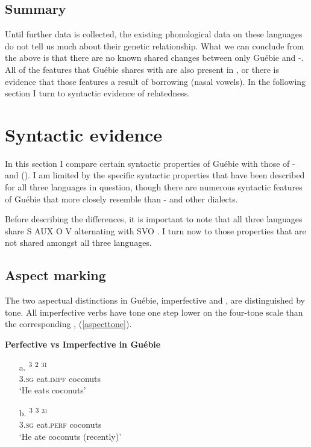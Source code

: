 \documentclass[output=paper,modfonts]{langscibook}
\begin{document}
\subsection{Summary}
Until further data is collected, the existing phonological data on these languages do not tell us much about their genetic relationship. What we can conclude from the above is that there are no known shared changes between only Guébie and -. All of the features that Guébie shares with  are also present in , or there is evidence that those features a result of borrowing (nasal vowels). In the following section I turn to syntactic evidence of relatedness.

\section{Syntactic evidence}\label{sec:sande:S-side}
In this section I compare certain syntactic properties of Guébie with those of - and  (). I am limited by the specific syntactic properties that have been described for all three languages in question, though there are numerous syntactic features of Guébie that more closely resemble  than - and other  dialects. 

Before describing the differences, it is important to note that all three languages share S AUX O V alternating with SVO . I turn now to those properties that are not shared amongst all three languages.

\subsection{Aspect marking}
The two  aspectual distinctions in Guébie, imperfective and , are distinguished by tone. All imperfective verbs have tone one step lower on the four-tone scale than the corresponding  , (\ref{aspecttone}).

\begin{exe}
\ex \textbf{Perfective vs Imperfective in Guébie}\label{aspecttone}
\begin{itemize}
\item[a.] \gll {}\textsuperscript{3} \textsuperscript{2} $^{31}$\\
\textsc{3.sg} eat.\textsc{impf} coconuts\\
\trans `He eats coconuts'
\item[b.] \gll {}\textsuperscript{3} \textsuperscript{3} $^{31}$\\
\textsc{3.sg} eat.\textsc{perf} coconuts\\
\trans `He ate coconuts (recently)'
\end{itemize}
\end{exe}
\end{document}
